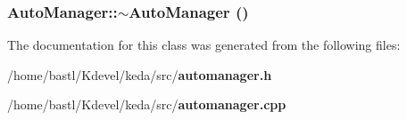 \subsubsection{\setlength{\rightskip}{0pt plus 5cm}Auto\-Manager::$\sim$Auto\-Manager ()}\label{classAutoManager_5acb268a0f8ec0d881ec716793c79e9c}




The documentation for this class was generated from the following files:\begin{CompactItemize}
\item 
/home/bastl/Kdevel/keda/src/{\bf automanager.h}\item 
/home/bastl/Kdevel/keda/src/{\bf automanager.cpp}\end{CompactItemize}
